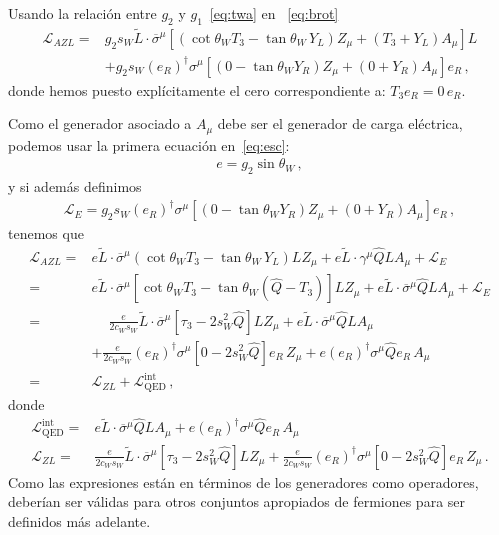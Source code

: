 \begin{frame}
Usando la relación entre $g_2$ y ${g_1}$~\eqref{eq:twa} en ~\eqref{eq:brot}
\begin{align}
    \mathcal{L}_{A Z L}
=&g_2 s_W \widetilde{L}\cdot\overline{\sigma}^\mu\left[\left(\cot\theta_WT_3- \tan\theta_W\,Y_L\right)Z_\mu
       +\left(T_3+Y_L\right) A_\mu\right]L \nonumber\\
&+g_2 s_W \left(e_R \right)^{\dagger}\sigma^\mu \left[ \left(0 -\tan\theta_W  Y_R  \right) Z_{\mu}  +\left( 0+ Y_R \right)  A_{\mu} \right]{e_R}\,,
\end{align}
donde hemos puesto explícitamente el cero correspondiente a: $T_3 e_R= 0 \,e_R$.

Como el generador asociado a $A_\mu$ debe ser el generador de carga eléctrica, podemos usar la primera ecuación en~\eqref{eq:esc}:
\begin{align}
  e=g_2\sin\theta_W\,,
\end{align}
y si además definimos
\begin{align}
  \mathcal{L}_{E}=g_2 s_W \left(e_R \right)^{\dagger}\sigma^\mu \left[ \left(0 -\tan\theta_W  Y_R  \right) Z_{\mu}  +\left( 0+ Y_R \right)  A_{\mu} \right]{e_R}\,,
\end{align}
tenemos que
\begin{align}
\label{eq:lazlf}
    \mathcal{L}_{A Z L}
=&e \widetilde{L}\cdot\overline{\sigma}^\mu\left(\cot\theta_W T_3-\tan\theta_W\,Y_L\right)L Z_\mu
       +e \widetilde{L}\cdot\gamma^\mu \widehat{Q} L A_\mu+\mathcal{L}_E\nonumber\\
=&e \widetilde{L}\cdot\overline{\sigma}^\mu\left[\cot\theta_W T_3-\tan\theta_W\left(\widehat{Q}-T_3\right)\right]L Z_\mu
       +e \widetilde{L}\cdot\overline{\sigma}^\mu \widehat{Q} L A_\mu + \mathcal{L}_E\nonumber\\
=&\phantom{+}\frac{e}{2c_W s_W} \widetilde{L}\cdot\overline{\sigma}^\mu\left[ \tau_3-2s_W^2\widehat{Q}\right]L Z_\mu
       +e \widetilde{L}\cdot\overline{\sigma}^\mu \widehat{Q} L A_\mu \nonumber\\
&+\frac{e}{2c_W s_W} \left( e_R \right)^{\dagger}{\sigma}^\mu\left[ 0-2s_W^2\widehat{Q}\right]e_R\, Z_\mu
       +e \left( e_R \right)^{\dagger}{\sigma}^\mu \widehat{Q} e_R\, A_\mu \nonumber\\
=&\mathcal{L}_{ZL}+\mathcal{L}^{\text{int}}_{\text{QED}} \,,
\end{align}
donde
\begin{align}
  \label{eq:LQED}
     \mathcal{L}^{\text{int}}_{\text{QED}}=&e \widetilde{L}\cdot\overline{\sigma}^\mu \widehat{Q} L A_\mu+
e \left( e_R \right)^{\dagger}{\sigma}^\mu \widehat{Q} e_R\, A_\mu \\
\mathcal{L}_{ZL}=&\frac{e}{2c_W s_W} \widetilde{L}\cdot\overline{\sigma}^\mu\left[ \tau_3-2s_W^2\widehat{Q}\right]L Z_\mu
+\frac{e}{2c_W s_W} \left( e_R \right)^{\dagger}{\sigma}^\mu\left[ 0-2s_W^2\widehat{Q}\right]e_R\, Z_\mu\,.
\end{align}
Como las expresiones están en términos de los generadores como operadores, deberían ser válidas para otros conjuntos apropiados de fermiones para ser definidos más adelante.



\end{frame}
